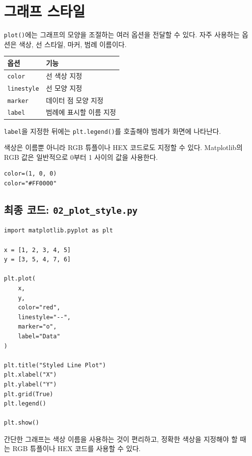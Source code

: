\documentclass[11pt,a4paper]{article}
\begin{document}
\section{그래프 스타일}

\texttt{plot()}에는 그래프의 모양을 조절하는 여러 옵션을 전달할 수 있다. 자주 사용하는 옵션은 색상, 선 스타일, 마커, 범례 이름이다.

\begin{center}
\begin{tabular}{ll}
\toprule
옵션 & 기능 \\
\midrule
\texttt{color} & 선 색상 지정 \\
\texttt{linestyle} & 선 모양 지정 \\
\texttt{marker} & 데이터 점 모양 지정 \\
\texttt{label} & 범례에 표시할 이름 지정 \\
\bottomrule
\end{tabular}
\end{center}

\texttt{label}을 지정한 뒤에는 \texttt{plt.legend()}를 호출해야 범례가 화면에 나타난다.

색상은 이름뿐 아니라 RGB 튜플이나 HEX 코드로도 지정할 수 있다. Matplotlib의 RGB 값은 일반적으로 0부터 1 사이의 값을 사용한다.

\begin{lstlisting}
color=(1, 0, 0)
color="#FF0000"
\end{lstlisting}

\subsection{최종 코드: \texttt{02\_plot\_style.py}}

\begin{lstlisting}
import matplotlib.pyplot as plt

x = [1, 2, 3, 4, 5]
y = [3, 5, 4, 7, 6]

plt.plot(
    x,
    y,
    color="red",
    linestyle="--",
    marker="o",
    label="Data"
)

plt.title("Styled Line Plot")
plt.xlabel("X")
plt.ylabel("Y")
plt.grid(True)
plt.legend()

plt.show()
\end{lstlisting}

\begin{importantbox}
간단한 그래프는 색상 이름을 사용하는 것이 편리하고, 정확한 색상을 지정해야 할 때는 RGB 튜플이나 HEX 코드를 사용할 수 있다.
\end{importantbox}
\end{document}
